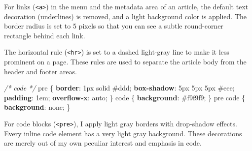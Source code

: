 \documentclass[12pt,]{krantz}
\makeatletter
\newenvironment{Shaded}{\begin{snugshade}}{\end{snugshade}}
\newcommand{\CommentTok}[1]{\textcolor[rgb]{0.56,0.35,0.01}{\textit{#1}}}
\newcommand{\DecValTok}[1]{\textcolor[rgb]{0.00,0.00,0.81}{#1}}
\newcommand{\InformationTok}[1]{\textcolor[rgb]{0.56,0.35,0.01}{\textbf{\textit{#1}}}}
\newcommand{\KeywordTok}[1]{\textcolor[rgb]{0.13,0.29,0.53}{\textbf{#1}}}
\newcommand{\NormalTok}[1]{#1}
\newenvironment{kframe}{%
\medskip{}
\setlength{\fboxsep}{.8em}
 \def\at@end@of@kframe{}%
 \ifinner\ifhmode%
  \def\at@end@of@kframe{\end{minipage}}%
  \begin{minipage}{\columnwidth}%
 \fi\fi%
 \def\FrameCommand##1{\hskip\@totalleftmargin \hskip-\fboxsep
 \colorbox{shadecolor}{##1}\hskip-\fboxsep
     \hskip-\linewidth \hskip-\@totalleftmargin \hskip\columnwidth}%
 \MakeFramed {\advance\hsize-\width
   \@totalleftmargin\z@ \linewidth\hsize
   \@setminipage}}%
 {\par\unskip\endMakeFramed%
 \at@end@of@kframe}
\renewenvironment{Shaded}{\begin{kframe}}{\end{kframe}}
\theoremstyle{definition}
\theoremstyle{definition}
\theoremstyle{definition}
\theoremstyle{remark}
\makeatother
\begin{document}
\begin{itemize}
  For links (\texttt{\textless{}a\textgreater{}}) in the menu and the
  metadata area of an article, the default text decoration (underlines)
  is removed, and a light background color is applied. The border radius
  is set to 5 pixels so that you can see a subtle round-corner rectangle
  behind each link.

  The horizontal rule (\texttt{\textless{}hr\textgreater{}}) is set to a
  dashed light-gray line to make it less prominent on a page. These
  rules are used to separate the article body from the header and footer
  areas.

\begin{Shaded}
\begin{Highlighting}[]
\CommentTok{/* code */}
\NormalTok{pre \{}
  \KeywordTok{border}\NormalTok{: }\DecValTok{1px} \DecValTok{solid} \DecValTok{#ddd}\NormalTok{;}
  \KeywordTok{box-shadow}\NormalTok{: }\DecValTok{5px} \DecValTok{5px} \DecValTok{5px} \DecValTok{#eee}\NormalTok{;}
  \KeywordTok{padding}\NormalTok{: }\DecValTok{1em}\NormalTok{;}
  \KeywordTok{overflow-x}\NormalTok{: }\DecValTok{auto}\NormalTok{;}
\NormalTok{\}}
\NormalTok{code \{ }\KeywordTok{background}\NormalTok{: }\DecValTok{#f9f9f9}\NormalTok{; \}}
\NormalTok{pre code \{ }\KeywordTok{background}\NormalTok{: }\DecValTok{none}\NormalTok{; \}}
\end{Highlighting}
\end{Shaded}

  For code blocks (\texttt{\textless{}pre\textgreater{}}), I apply light
  gray borders with drop-shadow effects. Every inline code element has a
  very light gray background. These decorations are merely out of my own
  peculiar interest and emphasis in code.

\begin{Shaded}
\end{Shaded}


\end{itemize}
\end{document}

